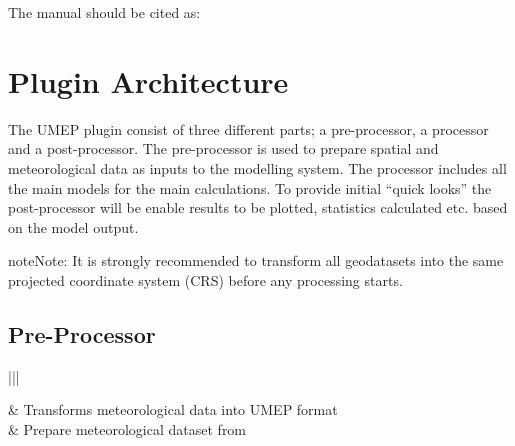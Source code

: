 \documentclass[letterpaper,10pt,english]{sphinxmanual}
\begin{document}
The manual should be cited as:
\begin{quote}

\end{quote}


\section{Plugin Architecture}
\label{\detokenize{Introduction:plugin-architecture}}\label{\detokenize{Introduction:pluginarchitecture}}
The UMEP plugin consist of three different parts; a pre-processor, a
processor and a post-processor. The pre-processor is used to prepare
spatial and meteorological data as inputs to the modelling system. The
processor includes all the main models for the main calculations. To
provide initial “quick looks” the post-processor will be enable results
to be plotted, statistics calculated etc. based on the model output.

\begin{sphinxadmonition}{note}{Note:}
It is strongly recommended to transform all geodatasets into the same projected coordinate system (CRS) before any processing starts.
\end{sphinxadmonition}


\subsection{Pre-Processor}
\label{\detokenize{Introduction:pre-processor}}


\begin{savenotes}\sphinxattablestart
\centering
\begin{tabular}[t]{|||}
\hline

{\hyperref[\detokenize{pre-processor/Meteorological Data MetPreprocessor:metpreprocessor}]{}}
&
Transforms meteorological data into UMEP format
\\
\hline
{\hyperref[\detokenize{pre-processor/Meteorological Data Download data (WATCH):watch}]{}}
&
Prepare meteorological dataset from 
\\
\hline
\end{tabular}
\par
\sphinxattableend\end{savenotes}
\end{document}
